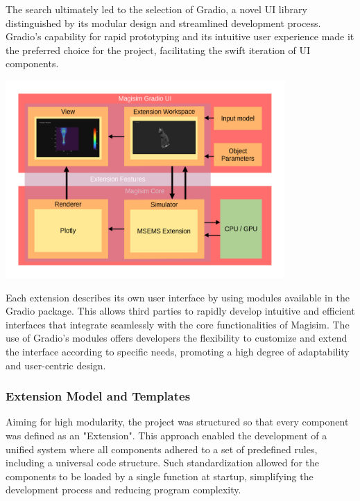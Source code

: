 \documentclass[11pt, a4paper, titlepage]{article}
\begin{document}
The search ultimately led to the selection of Gradio, a novel UI library distinguished by its modular design and streamlined development process. Gradio's capability for rapid prototyping and its intuitive user experience made it the preferred choice for the project, facilitating the swift iteration of UI components.
\begin{center}
	\includegraphics[width=0.8\textwidth]{softstruct.png}
\end{center}

Each extension describes its own user interface by using modules available in the Gradio package. This allows third parties to rapidly develop intuitive and efficient interfaces that integrate seamlessly with the core functionalities of Magisim. The use of Gradio's modules offers developers the flexibility to customize and extend the interface according to specific needs, promoting a high degree of adaptability and user-centric design.
\newpage
\subsubsection{Extension Model and Templates}

Aiming for high modularity, the project was structured so that every component was defined as an "Extension". This approach enabled the development of a unified system where all components adhered to a set of predefined rules, including a universal code structure. Such standardization allowed for the components to be loaded by a single function at startup, simplifying the development process and reducing program complexity.
\end{document}

